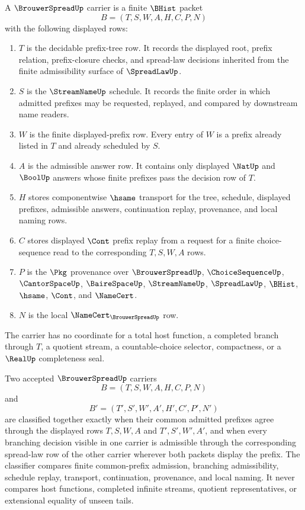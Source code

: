 \begin{definition}
\label{def:brouwer-spread-carrier}
A $\BrouwerSpreadUp$ carrier is a finite $\BHist$ packet
$$
B=(T,S,W,A,H,C,P,N)
$$
with the following displayed rows:
\begin{enumerate}
\item $T$ is the decidable prefix-tree row. It records the displayed root, prefix relation, prefix-closure checks, and spread-law decisions inherited from the finite admissibility surface of $\SpreadLawUp$.
\item $S$ is the $\StreamNameUp$ schedule. It records the finite order in which admitted prefixes may be requested, replayed, and compared by downstream name readers.
\item $W$ is the finite displayed-prefix row. Every entry of $W$ is a prefix already listed in $T$ and already scheduled by $S$.
\item $A$ is the admissible answer row. It contains only displayed $\NatUp$ and $\BoolUp$ answers whose finite prefixes pass the decision row of $T$.
\item $H$ stores componentwise $\hsame$ transport for the tree, schedule, displayed prefixes, admissible answers, continuation replay, provenance, and local naming rows.
\item $C$ stores displayed $\Cont$ prefix replay from a request for a finite choice-sequence read to the corresponding $T,S,W,A$ rows.
\item $P$ is the $\Pkg$ provenance over $\BrouwerSpreadUp$, $\ChoiceSequenceUp$, $\CantorSpaceUp$, $\BaireSpaceUp$, $\StreamNameUp$, $\SpreadLawUp$, $\BHist$, $\hsame$, $\Cont$, and $\NameCert$.
\item $N$ is the local $\NameCert_{\BrouwerSpreadUp}$ row.
\end{enumerate}
The carrier has no coordinate for a total host function, a completed branch through $T$, a quotient stream, a countable-choice selector, compactness, or a $\RealUp$ completeness seal.
\end{definition}

\begin{definition}
\label{def:brouwer-spread-classifier}
Two accepted $\BrouwerSpreadUp$ carriers
$$
B=(T,S,W,A,H,C,P,N)
$$
and
$$
B'=(T',S',W',A',H',C',P',N')
$$
are classified together exactly when their common admitted prefixes agree through the displayed rows $T,S,W,A$ and $T',S',W',A'$, and when every branching decision visible in one carrier is admissible through the corresponding spread-law row of the other carrier wherever both packets display the prefix. The classifier compares finite common-prefix admission, branching admissibility, schedule replay, transport, continuation, provenance, and local naming. It never compares host functions, completed infinite streams, quotient representatives, or extensional equality of unseen tails.
\end{definition}

